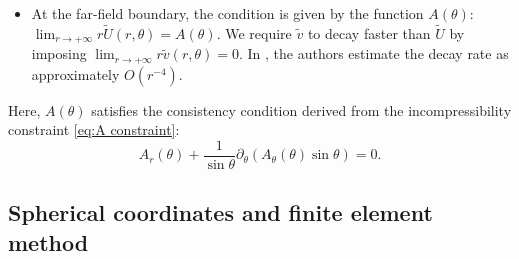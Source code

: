 \documentclass[11pt,a4paper]{article}
\numberwithin{equation}{section}
\newenvironment{itemizedot}{\begin{itemize} \renewcommand{\labelitemi}{$\bullet$}\renewcommand{\labelitemii}{$\bullet$}\renewcommand{\labelitemiii}{$\bullet$}\renewcommand{\labelitemiv}{$\bullet$}}{\end{itemize}}
\begin{document}
\begin{itemizedot}
  \item At the far-field boundary, the condition is given by the function $A (\theta)$: $\lim_{r
  \to + \infty} r \widetilde{U} (r, \theta) = A (\theta) .$ We require $\widetilde{v}$ to decay faster than $\widetilde{U}$ by imposing  $\lim_{r
  \to + \infty} r \widetilde{v} (r, \theta) = 0.$ In
  {\cite{guillod2023numerical}}, the authors estimate the decay rate as
  approximately $O (r^{- 4})$.
\end{itemizedot}
Here, $A (\theta)$ satisfies the consistency condition derived from the
incompressibility constraint \eqref{eq:A constraint}:
\begin{equation}
  A_r (\theta) + \frac{1}{\sin \theta} \partial_{\theta}  (A_{\theta} (\theta)
  \sin \theta) = 0. \label{eq:A constraint sph}
\end{equation}

\subsection{Spherical coordinates and finite element method}\label{sec:fem}
\end{document}
